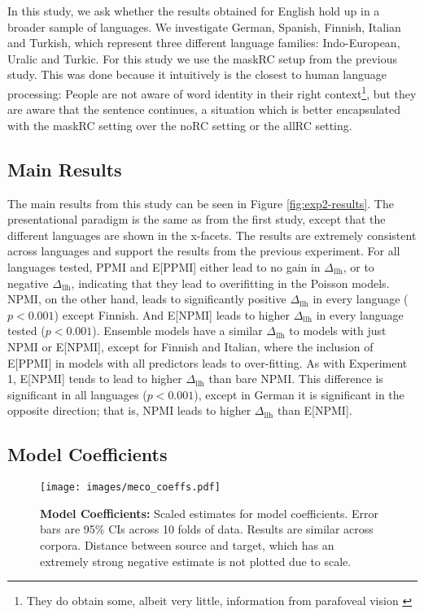 \documentclass[12pt]{article}
\newcommand{\dllmath}{\Delta_{\mathrm{llh}}}
\newcommand{\dll}{$\dllmath$\xspace}
\begin{document}
In this study, we ask whether the results obtained for English hold up in a broader sample of languages. We investigate German, Spanish, Finnish, Italian and Turkish, which represent three different language families: Indo-European, Uralic and Turkic. For this study we use the {\sc maskRC} setup from the previous study. This was done because it intuitively is the closest to human language processing: People are not  aware of word identity in their right context\footnote{They do obtain some, albeit very little, information from parafoveal vision \citep{schotter-etal:2012-parafoveal}}, but they are aware that the sentence continues, a situation which is better encapsulated with the {\sc maskRC} setting over the {\sc noRC} setting or the {\sc allRC} setting.

\subsection{Main Results}

The main results from this study can be seen in Figure \ref{fig:exp2-results}. The presentational paradigm is the same as from the first study, except that the different languages are shown in the x-facets. The results are extremely consistent across languages and support the results from the previous experiment. For all languages tested, PPMI and E[PPMI] either lead to no gain in \dll, or to negative \dll, indicating that they lead to overifitting in the Poisson models. NPMI, on the other hand, leads to significantly positive \dll in every language ($p<0.001$) except Finnish. And E[NPMI] leads to higher \dll in every language tested ($p<0.001$). Ensemble models have a similar \dll to models with just NPMI or E[NPMI], except for Finnish and Italian, where the inclusion of E[PPMI] in models with all predictors leads to over-fitting. As with Experiment 1, E[NPMI] tends to lead to higher \dll than bare NPMI. This difference is significant in all languages ($p<0.001$), except in German it is significant in the opposite direction; that is, NPMI leads to higher \dll than E[NPMI].

\subsection{Model Coefficients}

\begin{figure*}[t]
    \centering
    \begin{minipage}{0.95\textwidth}
    \centering
    \small
    \texttt{[image: images/meco\_coeffs.pdf]}
    \vspace{-0.8cm}
    \caption{ \small \textbf{Model Coefficients:} Scaled estimates for model coefficients. Error bars are 95\% CIs across 10 folds of data. Results are similar across corpora. Distance between source and target, which has an extremely strong negative estimate is not plotted due to scale.}
    \label{fig:exp2-coeffs}
    \end{minipage}
\end{figure*}
\end{document}
